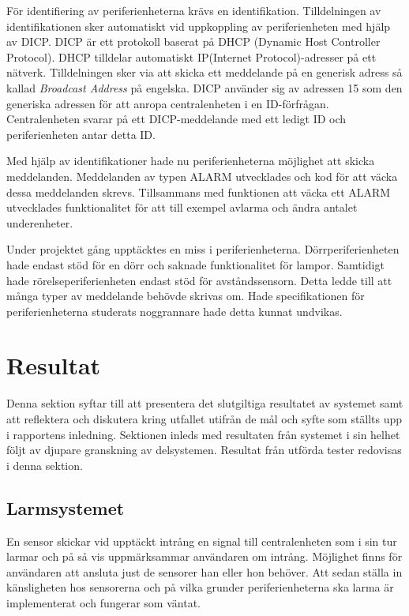 \documentclass[a4paper]{article}
\begin{document}
För identifiering av periferienheterna krävs en identifikation.
Tilldelningen av identifikationen sker automatiskt vid uppkoppling av periferienheten med hjälp av DICP.
DICP är ett protokoll baserat på DHCP (Dynamic Host Controller Protocol).
DHCP tilldelar automatiskt IP(Internet Protocol)-adresser på ett nätverk.
Tilldelningen sker via att skicka ett meddelande på en generisk adress så kallad \textit{Broadcast Address} på engelska.
DICP använder sig av adressen 15 som den generiska adressen för att anropa centralenheten i en ID-förfrågan.
Centralenheten svarar på ett DICP-meddelande med ett ledigt ID och periferienheten antar detta ID.

Med hjälp av identifikationer hade nu periferienheterna möjlighet att skicka meddelanden.
Meddelanden av typen ALARM utvecklades och kod för att väcka dessa meddelanden skrevs.
Tillsammans med funktionen att väcka ett ALARM utvecklades funktionalitet för att till exempel avlarma och ändra antalet underenheter.

Under projektet gång upptäcktes en miss i periferienheterna.
Dörrperiferienheten hade endast stöd för en dörr och saknade funktionalitet för lampor.
Samtidigt hade rörelseperiferienheten endast stöd för avståndssensorn.
Detta ledde till att många typer av meddelande behövde skrivas om.
Hade specifikationen för periferienheterna studerats noggrannare hade detta kunnat undvikas.


\section{Resultat}
Denna sektion syftar till att presentera det slutgiltiga resultatet av systemet samt att reflektera och diskutera kring utfallet utifrån de mål och syfte som ställts upp i rapportens inledning.
Sektionen inleds med resultaten från systemet i sin helhet följt av djupare granskning av delsystemen.
Resultat från utförda tester redovisas i denna sektion.

\subsection{Larmsystemet}
En sensor skickar vid upptäckt intrång en signal till centralenheten som i sin tur larmar och på så vis uppmärksammar användaren om intrång.
Möjlighet finns för användaren att ansluta just de sensorer han eller hon behöver.
Att sedan ställa in känsligheten hos sensorerna och på vilka grunder periferienheterna ska larma är implementerat och fungerar som väntat.
\end{document}
